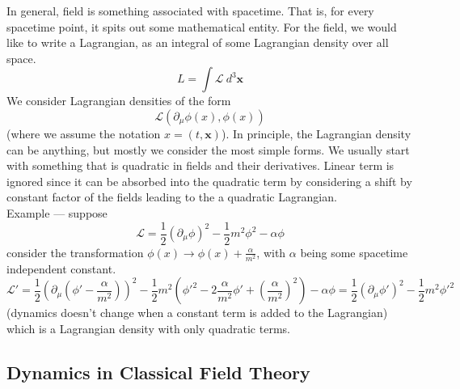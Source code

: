 \documentclass[11pt, notitlepage]{report}
\newcommand{\del}{\partial}
\newcommand{\ld}{\mathcal{L}}
\numberwithin{equation}{section}
\begin{document}
    In general, field is something associated with spacetime. That is, for every spacetime point, it spits out some mathematical entity. For the field, we would like to write a Lagrangian, as an integral of some Lagrangian density over all space. 
    \begin{equation}
        L = \int\ld ~d^3\textbf{x}
    \end{equation}
    We consider Lagrangian densities of the form 
    \begin{equation}
        \ld(\del_\mu \phi(x), \phi(x))
    \end{equation}
    (where we assume the notation \(x = (t, \textbf{x})\)). In principle, the Lagrangian density can be anything, but mostly we consider the most simple forms. We usually start with something that is quadratic in fields and their derivatives. Linear term is ignored since it can be absorbed into the quadratic term by considering a shift by constant factor of the fields leading to the a quadratic Lagrangian.\\
    Example — suppose
    \begin{equation}
        \ld = \frac{1}{2} (\del_\mu \phi)^2 - \frac{1}{2}m^2 \phi^2 - \alpha \phi
    \end{equation}
    consider the transformation \(\phi(x) \to \phi(x) + \displaystyle\frac{\alpha}{m^2}\), with \(\alpha\) being some spacetime independent constant. 
    \begin{equation}
        \ld' = \frac{1}{2} \left( \del_\mu \left(\phi' - \frac{\alpha}{m^2}\right)\right)^2 - \frac{1}{2} m^2 \left(\phi'^2 - 2\frac{\alpha}{m^2} \phi' + \left(\frac{\alpha}{m^2}\right)^2\right) - \alpha \phi = \frac{1}{2} (\del_\mu \phi')^2 - \frac{1}{2}m^2 \phi'^2
    \end{equation}
    (dynamics doesn't change when a constant term is added to the Lagrangian) which is a Lagrangian density with only quadratic terms. 

    \subsection{Dynamics in Classical Field Theory}
\end{document}

